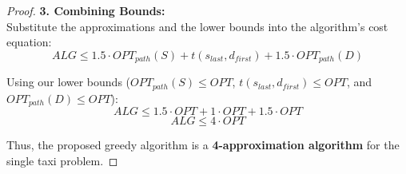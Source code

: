 \begin{proof}
\noindent\textbf{3. Combining Bounds:}\\
Substitute the approximations and the lower bounds into the algorithm's cost equation:
$$ALG \leq 1.5 \cdot OPT_{path}(S) + t(s_{last}, d_{first}) + 1.5 \cdot OPT_{path}(D)$$

Using our lower bounds ($OPT_{path}(S) \leq OPT$, $t(s_{last}, d_{first}) \leq OPT$, and $OPT_{path}(D) \leq OPT$):
$$ALG \leq 1.5 \cdot OPT + 1 \cdot OPT + 1.5 \cdot OPT$$
$$ALG \leq 4 \cdot OPT$$

Thus, the proposed greedy algorithm is a \textbf{4-approximation algorithm} for the single taxi problem.
\end{proof}
